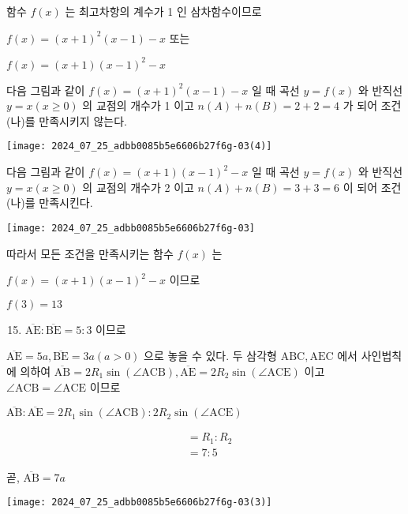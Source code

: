 \documentclass[10pt]{article}
\begin{document}
함수 $f(x)$ 는 최고차항의 계수가 1 인 삼차함수이므로

$f(x)=(x+1)^{2}(x-1)-x$ 또는

$f(x)=(x+1)(x-1)^{2}-x$

다음 그림과 같이 $f(x)=(x+1)^{2}(x-1)-x$ 일 때 곡선 $y=f(x)$ 와 반직선 $y=x(x \geq 0)$ 의 교점의 개수가 1 이고 $n(A)+n(B)=2+2=4$ 가 되어 조건 (나)를 만족시키지 않는다.

\begin{center}
\texttt{[image: 2024\_07\_25\_adbb0085b5e6606b27f6g-03(4)]}
\end{center}

다음 그림과 같이 $f(x)=(x+1)(x-1)^{2}-x$ 일 때 곡선 $y=f(x)$ 와 반직선 $y=x(x \geq 0)$ 의 교점의 개수가 2 이고 $n(A)+n(B)=3+3=6$ 이 되어 조건 (나)를 만족시킨다.

\begin{center}
\texttt{[image: 2024\_07\_25\_adbb0085b5e6606b27f6g-03]}
\end{center}

따라서 모든 조건을 만족시키는 함수 $f(x)$ 는

$f(x)=(x+1)(x-1)^{2}-x$ 이므로

$f(3)=13$

\begin{enumerate}
  \setcounter{enumi}{14}
  \item $\overline{\mathrm{AE}}: \overline{\mathrm{BE}}=5: 3$ 이므로
\end{enumerate}

$\overline{\mathrm{AE}}=5 a, \overline{\mathrm{BE}}=3 a(a>0)$ 으로 놓을 수 있다. 두 삼각형 $\mathrm{ABC}, \mathrm{AEC}$ 에서 사인법칙에 의하여 $\overline{\mathrm{AB}}=2 R_{1} \sin (\angle \mathrm{ACB}), \overline{\mathrm{AE}}=2 R_{2} \sin (\angle \mathrm{ACE})$ 이고 $\angle \mathrm{ACB}=\angle \mathrm{ACE}$ 이므로

$\overline{\mathrm{AB}}: \overline{\mathrm{AE}}=2 R_{1} \sin (\angle \mathrm{ACB}): 2 R_{2} \sin (\angle \mathrm{ACE})$

\[
\begin{aligned}
& =R_{1}: R_{2} \\
& =7: 5
\end{aligned}
\]

곧, $\overline{\mathrm{AB}}=7 a$

\begin{center}
\texttt{[image: 2024\_07\_25\_adbb0085b5e6606b27f6g-03(3)]}
\end{center}
\end{document}
